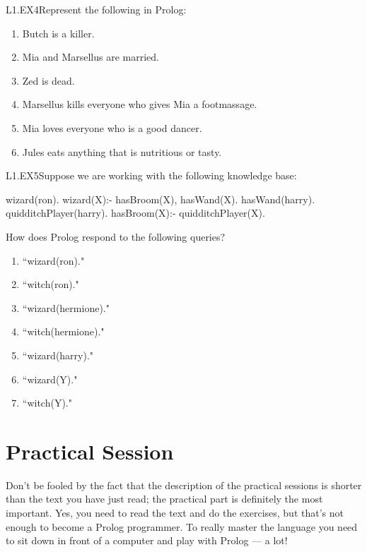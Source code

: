 \begin{LPNexercise}{L1.EX4}Represent the following in Prolog:

\begin{enumerate}
\item{}Butch is a killer.
\item{}Mia and Marsellus are married.
\item{}Zed is dead.
\item{}Marsellus kills everyone who gives Mia a footmassage.
\item{}Mia loves everyone who is a good dancer.
\item{}Jules eats anything that is nutritious or tasty.
\end{enumerate}
\end{LPNexercise}

\begin{LPNexercise}{L1.EX5}Suppose we are working with the following knowledge base:

\begin{LPNcodedisplay}
wizard(ron).
wizard(X):- hasBroom(X), hasWand(X).
hasWand(harry).
quidditchPlayer(harry).
hasBroom(X):- quidditchPlayer(X).
\end{LPNcodedisplay}


How does Prolog respond to the following queries?
\begin{enumerate}
\item{}``wizard(ron)."
\item{}``witch(ron)."
\item{}``wizard(hermione)."
\item{}``witch(hermione)."
\item{}``wizard(harry)."
\item{}``wizard(Y)."
\item{}``witch(Y)."
\end{enumerate}
\end{LPNexercise}



\section{Practical Session}\label{SEC.L1.PRAXIS}

Don't be fooled by the fact that the description of the practical
sessions is shorter than the text you have just read; the practical
part is definitely the most important. Yes, you need to read the text
and do the exercises, but that's not enough to become a Prolog
programmer. To really master the language you need to sit down in
front of a computer and play with Prolog --- a lot!

